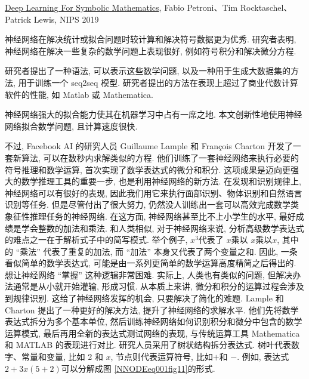 \href{https://openreview.net/forum?id=S1eZYeHFDSeId=S1eZYeHFDS}{Deep Learning For Symbolic Mathematics},  Fabio Petroni、Tim Rocktaschel、Patrick Lewis,  NIPS 2019

神经网络在解决统计或拟合问题时较计算和解决符号数据更为优秀. 研究者表明, 神经网络在解决一些复杂的数学问题上表现很好, 例如符号积分和解决微分方程.

研究者提出了一种语法, 可以表示这些数学问题, 以及一种用于生成大数据集的方法, 用于训练一个 seq2seq 模型. 研究者提出的方法在表现上超过了商业代数计算软件的性能, 如 Matlab 或 Mathematica.

神经网络强大的拟合能力使其在机器学习中占有一席之地. 本文创新性地使用神经网络拟合数学问题, 且计算速度很快.

不过, Facebook AI 的研究人员 Guillaume Lample 和 François Charton 开发了一套新算法, 可以在数秒内求解类似的方程. 他们训练了一套神经网络来执行必要的符号推理和数学运算, 首次实现了数学表达式的微分和积分.
这项成果是迈向更强大的数学推理工具的重要一步, 也是利用神经网络的新方法.
在发现和识别规律上, 神经网络可以有很好的表现, 因此我们用它来执行面部识别、物体识别和自然语言识别等任务.
但是尽管付出了很大努力, 仍然没人训练出一套可以高效完成数学类象征性推理任务的神经网络. 在这方面, 神经网络甚至比不上小学生的水平, 最好成绩是学会整数的加法和乘法.
和人类相似, 对于神经网络来说, 分析高级数学表达式的难点之一在于解析式子中的简写模式. 举个例子, $x^3$代表了 $x$乘以 $x$乘以$x$, 其中的 “乘法” 代表了重复的加法, 而 “加法” 本身又代表了两个变量之和.
因此, 一条看似简单的数学表达式, 可能是由一系列更简单的数学运算高度精简之后得出的.
想让神经网络 “掌握” 这种逻辑非常困难. 实际上, 人类也有类似的问题, 但解决办法通常是从小就开始灌输, 形成习惯.
从本质上来讲, 微分和积分的运算过程会涉及到规律识别. 这给了神经网络发挥的机会, 只要解决了简化的难题.
Lample 和 Charton 提出了一种更好的解决方法, 提升了神经网络的求解水平.
他们先将数学表达式拆分为多个基本单位, 然后训练神经网络如何识别积分和微分中包含的数学运算模式, 最后再用全新的表达式测试网络的表现, 与传统运算工具 Mathematica 和 MATLAB 的表现进行对比.
研究人员采用了树状结构拆分表达式. 树叶代表数字、常量和变量, 比如 2 和 $x$, 节点则代表运算符号, 比如$+$和 $-$.
例如, 表达式 $2 + 3 x (5+2)$可以分解成图 \ref{NNODEeq001fig11}的形式.
